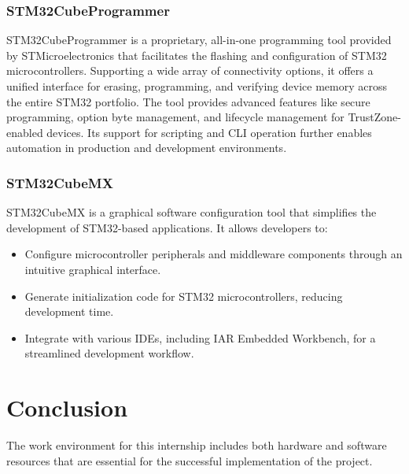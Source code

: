 \subsubsection{STM32CubeProgrammer}
STM32CubeProgrammer is a proprietary, all-in-one programming tool provided by STMicroelectronics that facilitates the flashing and configuration of STM32 microcontrollers. Supporting a wide array of connectivity options, it offers a unified interface for erasing, programming, and verifying device memory across the entire STM32 portfolio. The tool provides advanced features like secure programming, option byte management, and lifecycle management for TrustZone-enabled devices. Its support for scripting and CLI operation further enables automation in production and development environments.
\subsubsection{STM32CubeMX}
STM32CubeMX is a graphical software configuration tool that simplifies the development of STM32-based applications. It allows developers to:
\begin{itemize}
	\item Configure microcontroller peripherals and middleware components through an intuitive graphical interface.
	\item Generate initialization code for STM32 microcontrollers, reducing development time.
	\item Integrate with various IDEs, including IAR Embedded Workbench, for a streamlined development workflow.
\end{itemize}
\section*{Conclusion}
The work environment for this internship includes both hardware and software resources that are essential for the successful implementation of the project.
